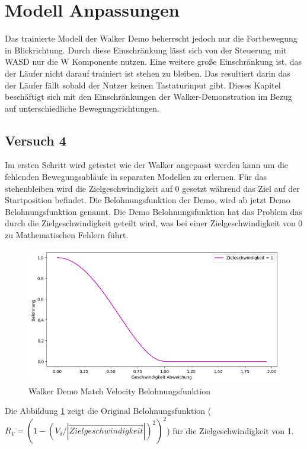 \section{Modell Anpassungen}
Das trainierte Modell der Walker Demo beherrscht jedoch nur die Fortbewegung in Blickrichtung. Durch diese Einschränkung lässt sich von der Steuerung mit WASD nur die W Komponente nutzen. Eine weitere große Einschränkung ist, das der Läufer nicht darauf trainiert ist stehen zu bleiben. Das resultiert darin das der Läufer fällt sobald der Nutzer keinen Tastaturinput gibt. Dieses Kapitel beschäftigt sich mit den Einschränkungen der Walker-Demonstration im Bezug auf unterschiedliche Bewegungsrichtungen.

\subsection{Versuch 4}
Im ersten Schritt wird getestet wie der Walker angepasst werden kann um die fehlenden Bewegungsabläufe in separaten Modellen zu erlernen.
Für das stehenbleiben wird die Zielgeschwindigkeit auf 0 gesetzt während das Ziel auf der Startposition befindet. Die Belohnungsfunktion der Demo, wird ab jetzt Demo Belohnungsfunktion genannt. Die Demo Belohnungsfunktion hat das Problem das durch die Zielgeschwindigkeit geteilt wird, was bei einer Zielgeschwindigkeit von 0 zu Mathematischen Fehlern führt.\\
\begin{figure}[H]
  \centering  
  \includegraphics[scale=0.5]{img/match_velocity_original_vel1.png}
  \caption{Walker Demo Match Velocity Belohnungsfunktion}
  \label{fig:match_velocity_original_vel1}
\end{figure}
Die Abbildung \ref{fig:match_velocity_original_vel1} zeigt die Original Belohnungsfunktion ($R_V=(1 - (V_\delta / |\vec{Zielgeschwindigkeit}|)^2)^2$) für die Zielgeschwindigkeit von 1. \\
